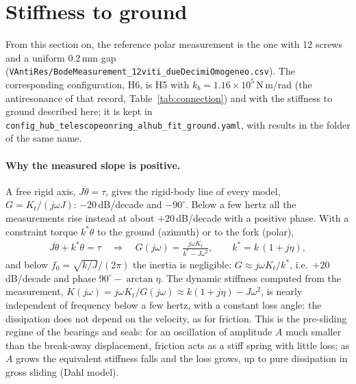 \documentclass[10pt,a4paper]{article}
\numberwithin{equation}{section}
\begin{document}
\section{Stiffness to ground}\label{sec:ground}
From this section on, the reference polar measurement is the one with 12 screws and a uniform 0.2\,mm gap (\texttt{VAntiRes/BodeMeasurement\_12viti\_dueDecimiOmogeneo.csv}). The corresponding configuration, H6, is H5 with $k_b = 1.16\times10^{5}$\,N\,m/rad (the antiresonance of that record, Table~\ref{tab:connection}) and with the stiffness to ground described here; it is kept in \texttt{config\_hub\_\allowbreak telescopeonring\_\allowbreak alhub\_\allowbreak fit\_\allowbreak ground.yaml}, with results in the folder of the same name.
\paragraph{Why the measured slope is positive.} A free rigid axis, $J\ddot\theta = \tau$, gives the rigid-body line of every model, $G = K_t/(j\omega J)$: $-20$\,dB/decade and $-90^\circ$. Below a few hertz all the measurements rise instead at about $+20$\,dB/decade with a positive phase. With a constraint torque $k^{*}\theta$ to the ground (azimuth) or to the fork (polar),
\begin{gather}
J\ddot\theta + k^{*}\theta = \tau\quad\Longrightarrow\quad G(j\omega) = \frac{j\omega K_t}{k^{*} - J\omega^2},\qquad k^{*} = k\,(1 + j\eta),\label{eq:ground}
\end{gather}
and below $f_0 = \sqrt{k/J}/(2\pi)$ the inertia is negligible: $G \approx j\omega K_t/k^{*}$, i.e.\ $+20$\,dB/decade and phase $90^\circ - \arctan\eta$. The dynamic stiffness computed from the measurement, $K(j\omega) = j\omega K_t/G(j\omega) \approx k(1 + j\eta) - J\omega^2$, is nearly independent of frequency below a few hertz, with a constant loss angle: the dissipation does not depend on the velocity, as for friction. This is the pre-sliding regime of the bearings and seals: for an oscillation of amplitude $A$ much smaller than the break-away displacement, friction acts as a stiff spring with little loss; as $A$ grows the equivalent stiffness falls and the loss grows, up to pure dissipation in gross sliding (Dahl model).
\end{document}

